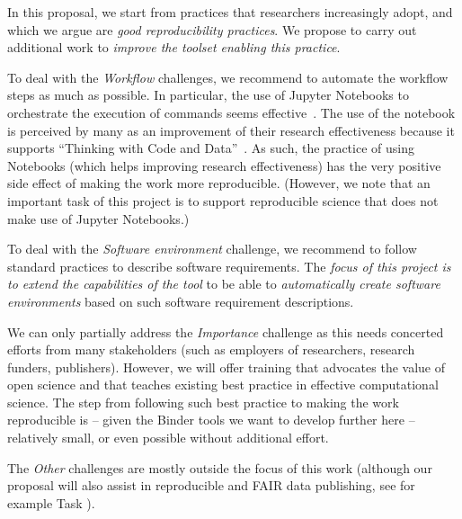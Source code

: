 In this proposal, we start from practices that researchers increasingly adopt,
and which we argue are \emph{good reproducibility practices}. We propose to carry
out additional work to \emph{improve the toolset enabling this practice}.

To deal with the \emph{Workflow} challenges, we recommend to automate the
workflow steps as much as possible. In particular, the use of Jupyter Notebooks
to orchestrate the execution of commands seems effective~\cite{Beg2021}.
The use of the notebook is
perceived by many as an improvement of their research effectiveness because
it supports ``Thinking with Code and Data''~\cite{Granger2021}. As such, the
practice of using Notebooks (which helps improving research effectiveness) has
the very positive side effect of making the work more reproducible. (However, we
note that an important task of this project is to support reproducible science
that does not make use of Jupyter Notebooks.)

To deal with the \emph{Software environment} challenge, we recommend to follow
standard practices to describe software requirements. The \emph{focus of this
project is to extend the capabilities of the \repotodocker{} tool} to be able to
\emph{automatically create software environments} based on such software
requirement descriptions.

We can only partially address the \emph{Importance} challenge as this needs
concerted efforts from many stakeholders (such as employers of researchers,
research funders, publishers). However, we will offer training that advocates
the value of open science and that teaches existing best practice in
effective computational science. The step from following such best practice to
making the work reproducible is -- given the Binder tools we want to develop
further here -- relatively small, or even possible without additional effort.

The \emph{Other} challenges are mostly outside the focus of this work
(although our proposal will also assist in reproducible and FAIR data
publishing, see for example Task ).





